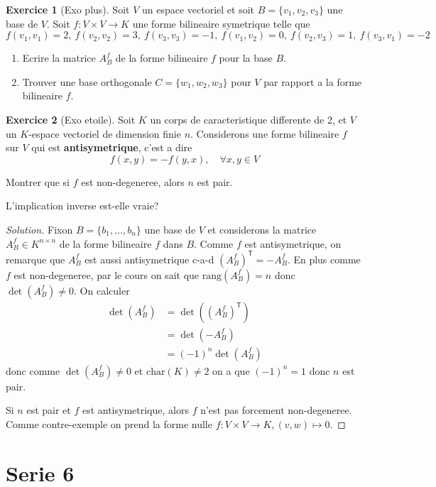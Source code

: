 \documentclass[a4paper,12pt,french]{report}
\theoremstyle{plain}
\theoremstyle{definition}
\newtheorem{exercise}{Exercice}[chapter]
\begin{document}
\begin{exercise}[Exo plus]
Soit $V$ un espace vectoriel et soit $B=\{ v_{1},v_{2},v_{3} \}$ une base de $V$. Soit $f:V\times V\to K$ une forme bilineaire symetrique telle que 
$$
f(v_{1},v_{1})=2,~f(v_{2},v_{2})=3,~f(v_{3},v_{3})=-1,~f(v_{1},v_{2})=0,~f(v_{2},v_{3})=1,~f(v_{3},v_{1})=-2
$$
\begin{enumerate}
\item Ecrire la matrice $A_{B}^{f}$ de la forme bilineaire $f$ pour la base $B$.
\item Trouver une base orthogonale $C=\{ w_{1},w_{2},w_{3} \}$ pour $V$ par rapport a la forme bilineaire $f$.
\end{enumerate}
\end{exercise}
\begin{exercise}[Exo etoile]
Soit $K$ un corps de caracteristique differente de 2, et $V$ un $K$-espace vectoriel de dimension finie $n$. Considerons une forme bilineaire $f$ sur $V$ qui est \textbf{antisymetrique}, c'est a dire 
$$
f(x,y)=-f(y,x), \quad \forall x,y\in V
$$

Montrer que si $f$ est non-degeneree, alors $n$ est pair.

L'implication inverse est-elle vraie?
\end{exercise}
\begin{proof}[Solution]
Fixon $B=\{ b_{1},\dots ,b_{n} \}$ une base de $V$ et considerons la matrice $A_{B}^{f}\in K^{n\times n}$ de la forme bilineaire $f$ dans $B$. Comme $f$ est antisymetrique, on remarque que $A_{B}^{f}$ est aussi antisymetrique c-a-d $(A_{B}^{f})^{\mathsf{T}}=-A_{B}^{f}$. En plus comme $f$ est non-degeneree, par le cours on sait que $\mathrm{rang}(A_{B}^{f})=n$ donc $\det(A_{B}^{f})\neq 0$. On calculer
\begin{align*}
\det(A_{B}^{f}) & =\det((A_{B}^{f})^{\mathsf{T}}) \\
 & = \det(-A_{B}^{f}) \\
 & =(-1)^{n}\det(A_{B}^{f})
\end{align*}
donc comme $\det(A_{B}^{f})\neq0$ et $\mathrm{char}(K)\neq 2$ on a que $(-1)^{n}=1$ donc $n$ est pair.

Si $n$ est pair et $f$ est antisymetrique, alors $f$ n'est pas forcement non-degeneree. Comme contre-exemple on prend la forme nulle $f:V\times V\to K, (v,w)\mapsto 0$.
\end{proof}


\chapter{Serie 6}
\end{document}
